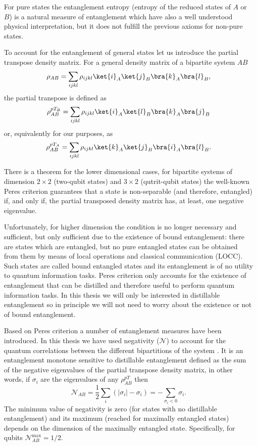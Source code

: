 For pure states the entanglement entropy (entropy of the reduced states of $A$ or $B$) is a natural measure of entanglement which have also a well understood physical interpretation, but it does not fulfill the previous axioms for non-pure states.

To account for the entanglement of general states let us introduce the partial transpose density matrix. For a general density matrix of a bipartite system $AB$
\begin{equation}
\rho_{AB}=\sum_{ijkl}\rho_{ijkl}\ket{i}_A\ket{j}_B\bra{k}_A\bra{l}_B,
\end{equation}
the partial transpose is defined as
\begin{equation}\label{ptranspdef}
\rho_{AB}^{p{T_B}}=\sum_{ijkl}\rho_{ijkl}\ket{i}_A\ket{l}_B\bra{k}_A\bra{j}_B
\end{equation}
or, equivalently for our purposes, as 
\begin{equation}
\rho_{AB}^{p{T_A}}=\sum_{ijkl}\rho_{ijkl}\ket{k}_A\ket{j}_B\bra{i}_A\bra{l}_B.
\end{equation}

There is a theorem for the lower dimensional cases, for bipartite systems of dimension $2\times 2$ (two-qubit states) and $3\times2$ (qutrit-qubit states) the well-known Peres criterion \cite{PeresCriterion} guarantees that a state is non-separable (and therefore, entangled) if, and only if, the partial transposed density matrix has, at least, one negative eigenvalue.

Unfortunately, for higher dimension the condition is no longer necessary and sufficient, but only sufficient due to the existence of bound entanglement: there are states which are entangled, but no pure entangled states can be obtained from them by means of local operations and classical communication (LOCC). Such states are called bound entangled states \cite{Bound} and its entanglement is of no utility to quantum information tasks. Peres criterion only accounts for the existence of entanglement that can be distilled and therefore useful to perform quantum information tasks. In this thesis we will only be interested in distillable entanglement so in principle we will not need to worry about the existence or not of bound entanglement.

Based on Peres criterion a number of entanglement measures have been introduced. In this thesis we have used negativity ($\mathcal{N}$) to account for the quantum correlations between the different bipartitions of the system \cite{Negat}. It is an entanglement monotone sensitive to distillable entanglement defined as the sum of the negative eigenvalues of the partial transpose density matrix, in other words, if $\sigma_i$ are the eigenvalues of any $\rho^{pT}_{AB}$ then
\begin{equation}\label{negativitydef}
\mathcal{N}_{AB}=\frac12\sum_{ i}(|\sigma_i|-\sigma_i)=-\sum_{\sigma_i<0}\sigma_i.
\end{equation}
The minimum value of negativity is zero (for states with no distillable entanglement) and its maximum (reached for maximally entangled states) depends on the dimension of the maximally entangled state. Specifically, for qubits $\mathcal{N}_{AB}^{\text{max}}=1/2$.

